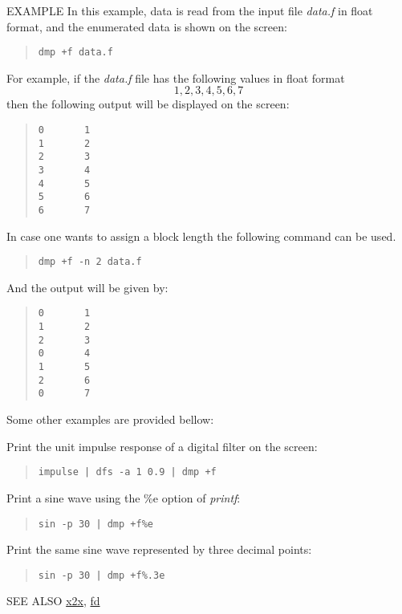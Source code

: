 \begin{qsection}{EXAMPLE}
In this example, data is read from the input file
{\em data.f} in float format, and the enumerated data is shown on the screen:
\begin{quote}
 \verb!dmp +f data.f!
\end{quote}
For example, if the {\em data.f} file has the following values
in float format
\begin{displaymath}
  1, 2, 3, 4, 5, 6, 7
\end{displaymath}
then the following output will be displayed on the screen:
\begin{quote}
  \verb!0       1! \\
  \verb!1       2! \\
  \verb!2       3! \\
  \verb!3       4! \\
  \verb!4       5! \\
  \verb!5       6! \\
  \verb!6       7!
\end{quote}
\par
In case one wants to assign a block length the following command can
be used.
\begin{quote}
 \verb!dmp +f -n 2 data.f!
\end{quote}
And the output will be given by:
\begin{quote}
  \verb!0       1! \\
  \verb!1       2! \\
  \verb!2       3! \\
  \verb!0       4! \\
  \verb!1       5! \\
  \verb!2       6! \\
  \verb!0       7!
\end{quote}
Some other examples are provided bellow:
\par
Print the unit impulse response of a digital filter on the screen:
\begin{quote}
  \verb!impulse | dfs -a 1 0.9 | dmp +f!
\end{quote}
\par
Print a sine wave using the \%e option of {\em printf}:
\begin{quote}
  \verb!sin -p 30 | dmp +f%e!
\end{quote}
\par
Print the same sine wave represented by three decimal points:
\begin{quote}
  \verb!sin -p 30 | dmp +f%.3e!
\end{quote}
\end{qsection}

\begin{qsection}{SEE ALSO}
\hyperlink{x2x}{x2x},
\hyperlink{fd}{fd}
\end{qsection}
